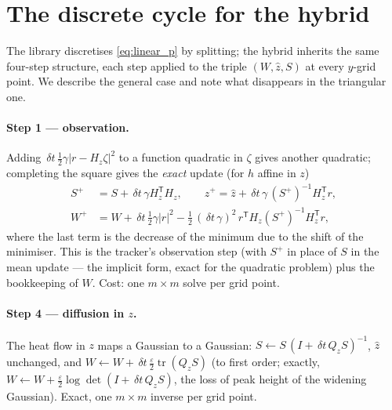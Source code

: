 \documentclass[11pt,a4paper]{article}
\newcommand{\tr}{\operatorname{tr}}
\newcommand{\T}{^{\mathsf T}}
\newcommand{\zh}{\hat{z}}
\newcommand{\eps}{\varepsilon}
\newcommand{\abs}[1]{\left\lvert #1 \right\rvert}
\newcommand{\dt}{\,\delta t}
\theoremstyle{plain}
\theoremstyle{definition}
\theoremstyle{remark}
\begin{document}
\section{The discrete cycle for the hybrid}
\label{sec:cycle}

The library discretises \eqref{eq:linear_p} by splitting; the hybrid inherits the same four-step structure, each step applied to the triple $(W,\zh,S)$ at every $y$-grid point. We describe the general case and note what disappears in the triangular one.

\paragraph{Step 1 --- observation.}
Adding $\dt\,\tfrac12\gamma\abs{r - H_z\zeta}^2$ to a function quadratic in $\zeta$ gives another quadratic; completing the square gives the \emph{exact} update (for $h$ affine in $z$)
\begin{equation}
\begin{aligned}
  S^+ &= S + \dt\,\gamma H_z\T H_z, \qquad
  \zh^+ = \zh + \dt\,\gamma\,(S^+)^{-1}H_z\T r, \\
  W^+ &= W + \dt\,\tfrac12\gamma\abs r^2 - \tfrac12\,(\dt\,\gamma)^2\, r\T H_z (S^+)^{-1} H_z\T r ,
\end{aligned}
\label{eq:cycle_obs}
\end{equation}
where the last term is the decrease of the minimum due to the shift of the minimiser. This is the tracker's observation step (with $S^+$ in place of $S$ in the mean update --- the implicit form, exact for the quadratic problem) plus the bookkeeping of $W$. Cost: one $m\times m$ solve per grid point.

\paragraph{Step 4 --- diffusion in $z$.}
The heat flow in $z$ maps a Gaussian to a Gaussian: $S \leftarrow S\,(I + \dt\,Q_zS)^{-1}$, $\zh$ unchanged, and $W \leftarrow W + \dt\,\tfrac{\eps}{2}\tr(Q_zS)$ (to first order; exactly, $W \leftarrow W + \tfrac{\eps}{2}\log\det(I+\dt\,Q_zS)$, the loss of peak height of the widening Gaussian). Exact, one $m\times m$ inverse per grid point.
\end{document}
